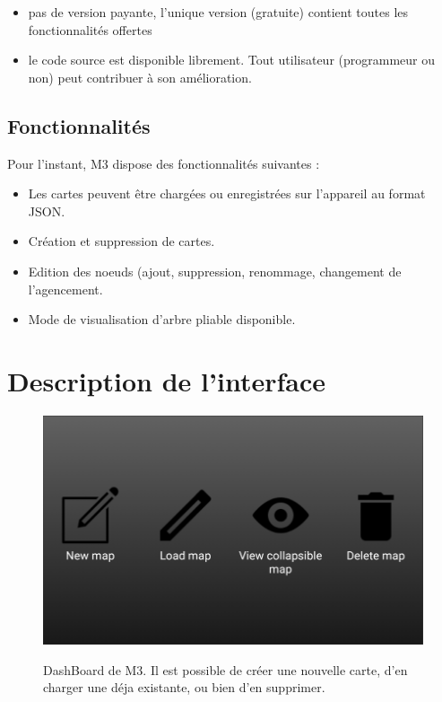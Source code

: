 \documentclass[11pt,a4paper,margin=0.5in]{report}
\begin{document}
\begin{itemize}
\item pas de version payante, l'unique version (gratuite) contient toutes les fonctionnalités offertes
\item le code source est disponible librement. Tout utilisateur (programmeur ou non) peut contribuer à son amélioration.
\end{itemize}

\section{Fonctionnalités}

Pour l'instant, M3 dispose des fonctionnalités suivantes :

\begin{itemize}
\item Les cartes peuvent être chargées ou enregistrées sur l'appareil au format JSON.
\item Création et suppression de cartes.
\item Edition des noeuds (ajout, suppression, renommage, changement de l'agencement.
\item Mode de visualisation d'arbre pliable disponible.
\end{itemize}

\chapter{Description de l'interface}


\begin{figure}[!ht]
  \centering
    \includegraphics[width=1\textwidth]{dashb.png} \\[0.25in]
  \caption{DashBoard de M3. Il est possible de créer une nouvelle carte, d'en charger une déja existante, ou bien d'en supprimer.}
\end{figure}
\end{document}
